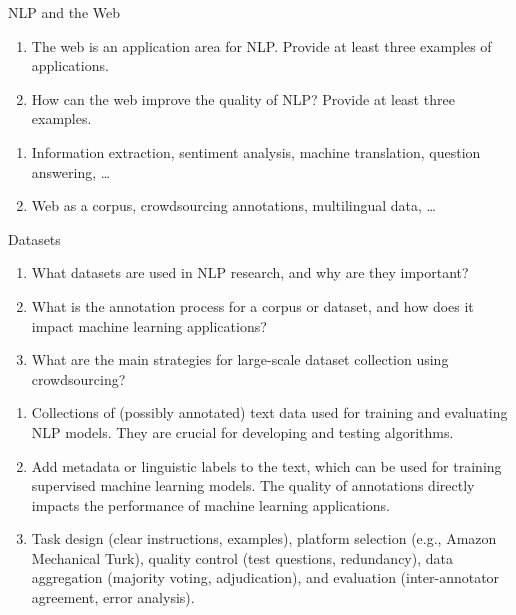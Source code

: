 \documentclass{article}
\begin{document}
\setcounter{section}{2021}

\begin{exercise}{NLP and the Web}
  \begin{enumerate}
    \item The web is an application area for NLP. Provide at least three examples of applications.
    \item How can the web improve the quality of NLP? Provide at least three examples.
  \end{enumerate}

  \begin{solution}
    \begin{enumerate}
      \item Information extraction, sentiment analysis, machine translation, question answering, …
      \item Web as a corpus, crowdsourcing annotations, multilingual data, …
    \end{enumerate}
  \end{solution}
\end{exercise}

\begin{exercise}{Datasets}
  \begin{enumerate}
    \item What datasets are used in NLP research, and why are they important?
    \item What is the annotation process for a corpus or dataset, and how does it impact machine learning applications?
    \item What are the main strategies for large-scale dataset collection using crowdsourcing?
  \end{enumerate}

  \begin{solution}
    \begin{enumerate}
      \item Collections of (possibly annotated) text data used for training and evaluating NLP models. They are crucial for developing and testing algorithms.
      \item Add metadata or linguistic labels to the text, which can be used for training supervised machine learning models. The quality of annotations directly impacts the performance of machine learning applications.
      \item Task design (clear instructions, examples), platform selection (e.g., Amazon Mechanical Turk), quality control (test questions, redundancy), data aggregation (majority voting, adjudication), and evaluation (inter-annotator agreement, error analysis).
    \end{enumerate}
  \end{solution}
\end{exercise}
\end{document}
